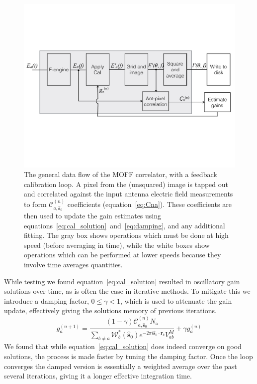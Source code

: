 \documentclass[a4paper,fleqn,usenatbib]{mnras}
\newcommand{\Nant}{\ensuremath{N_{\mathrm{a}}}}
\newcommand{\spix}{\ensuremath{\hat{\mathbf{s}}_{0}}}
\newcommand{\Cna}[1][n]{\ensuremath{\mathcal{C}^{(#1)}_{a,\spix}}}
\newcommand{\rb}{\ensuremath{\mathbf{r}_b}}
\newcommand{\damp}{\ensuremath{\gamma}}
\begin{document}
\begin{figure}
\begin{center}
\includegraphics[width=\columnwidth]{fig2.pdf}
\caption{The general data flow of the MOFF correlator, with a feedback calibration loop. A pixel 
from the (unsquared) image is tapped out and correlated against the input antenna electric field 
measurements to form $\Cna$ coefficients (equation~\ref{eq:Cna}). These coefficients are then 
used to update the gain estimates using equations~\ref{eq:cal_solution}~and~\ref{eq:damping},
and any additional fitting.
The gray box shows operations which must be done at high speed (before averaging in time),
while the white boxes show operations which can be performed at lower speeds because
they involve time averages quantities.
}
\label{fig:schematic}
\end{center}
\end{figure}

While testing we found equation~\ref{eq:cal_solution} resulted in oscillatory gain solutions over time, 
as is often the case in iterative methods. To mitigate this we 
introduce a damping factor, $0 \leq \damp <1$, which is used to attenuate the gain update, 
effectively giving the solutions memory of previous iterations.
\begin{equation}\label{eq:damping}
g^{(n+1)}_a = \frac{(1-\damp)\Cna \Nant }{ \sum_{b\ne a} \mathcal{W}^*_b(\spix) e^{-2\pi i \spix \cdot \rb} V^M_{ab} }+ \damp g^{(n)}_a
\end{equation}
We found that while equation~\ref{eq:cal_solution} does indeed converge on good solutions, 
the process is made faster by tuning the damping factor. 
 Once the loop converges the damped version is 
essentially a weighted average over the past several iterations, giving it a longer effective 
integration time. 
\end{document}
